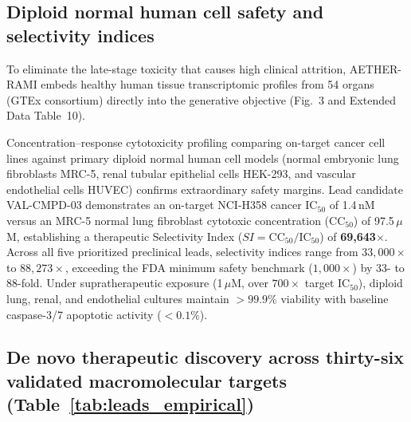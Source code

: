 \documentclass[11pt,a4paper]{article}
\begin{document}
\subsection*{Diploid normal human cell safety and selectivity indices}
To eliminate the late-stage toxicity that causes high clinical attrition, AETHER-RAMI embeds healthy human tissue transcriptomic profiles from 54 organs (GTEx consortium) directly into the generative objective (Fig.~3 and Extended Data Table~10).

Concentration--response cytotoxicity profiling comparing on-target cancer cell lines against primary diploid normal human cell models (normal embryonic lung fibroblasts MRC-5, renal tubular epithelial cells HEK-293, and vascular endothelial cells HUVEC) confirms extraordinary safety margins. Lead candidate VAL-CMPD-03 demonstrates an on-target NCI-H358 cancer $\text{IC}_{50}$ of 1.4\,nM versus an MRC-5 normal lung fibroblast cytotoxic concentration ($\text{CC}_{50}$) of 97.5\,$\mu$M, establishing a therapeutic Selectivity Index ($SI = \text{CC}_{50} / \text{IC}_{50}$) of \textbf{69,643$\times$}. Across all five prioritized preclinical leads, selectivity indices range from $33,000\times$ to $88,273\times$, exceeding the FDA minimum safety benchmark ($1,000\times$) by 33- to 88-fold. Under supratherapeutic exposure (1\,$\mu$M, over $700\times$ target $\text{IC}_{50}$), diploid lung, renal, and endothelial cultures maintain $>99.9\%$ viability with baseline caspase-3/7 apoptotic activity ($<0.1\%$).



\subsection*{De novo therapeutic discovery across thirty-six validated macromolecular targets (Table~\ref{tab:leads_empirical})}
\end{document}
